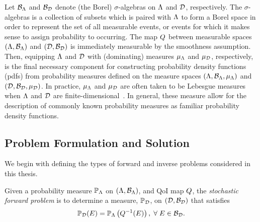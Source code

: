 Let $\mathcal{B}_{{\Lambda}}$ and $\mathcal{B}_{\mathcal{D}}$ denote (the Borel) $\sigma$-algebras on ${\Lambda}$ and $\mathcal{D}$, respectively.
The $\sigma$-algebras is a collection of subsets which is paired with ${\Lambda}$ to form a Borel space in order to represent the set of all measurable events, or events for which it makes sense to assign probability to occurring.
The map $Q$ between measurable spaces $({\Lambda}, \mathcal{B}_{{\Lambda}})$ and $(\mathcal{D}, \mathcal{B}_{\mathcal{D}})$ is immediately measurable by the smoothness assumption.
Then, equipping ${\Lambda}$ and $\mathcal{D}$ with (dominating) measures $\mu_{{\Lambda}}$ and $\mu_{\mathcal{D}}$, respectively, is the final necessary component for constructing probability density functions (pdfs) from probability measures defined on the measure spaces $({\Lambda}, \mathcal{B}_{{\Lambda}}, \mu_{{\Lambda}})$ and $(\mathcal{D}, \mathcal{B}_{\mathcal{D}}, \mu_{\mathcal{D}})$.
In practice, $\mu_{{\Lambda}}$ and $\mu_{\mathcal{D}}$ are often taken to be Lebesgue measures when ${\Lambda}$ and $\mathcal{D}$ are finite-dimensional~\cite{BET+14, BJW18}.
In general, these measure allow for the description of commonly known probability measures as familiar probability density functions.

\subsection{Problem Formulation and Solution}
We begin with defining the types of forward and inverse problems considered in this thesis.

\begin{defn}\label{defn:forward-problem}
  Given a probability measure $\mathbb{P}_{\Lambda}$ on $({\Lambda}, \mathcal{B}_{{\Lambda}})$, and QoI map $Q$, the \emph{stochastic forward problem} is to determine a measure, $\mathbb{P}_{\mathcal{D}}$, on $(\mathcal{D}, \mathcal{B}_{\mathcal{D}})$ that satisfies
  \begin{equation}\label{eq:forward-problem}
    \mathbb{P}_{\mathcal{D}} (E) = \mathbb{P}_{\Lambda} \left ( Q^{-1}(E) \right ), \; \forall \; E \in \mathcal{B}_{\mathcal{D}}.
  \end{equation}
\end{defn}

